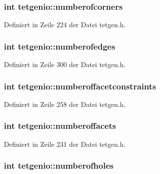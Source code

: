 \hypertarget{classtetgenio_a7d31410cbdcf2c1557ae7c1148c2eed7}{
\subsubsection[{numberofcorners}]{\setlength{\rightskip}{0pt plus 5cm}int tetgenio\-::numberofcorners}}\label{classtetgenio_a7d31410cbdcf2c1557ae7c1148c2eed7}


Definiert in Zeile 224 der Datei tetgen.\-h.

\hypertarget{classtetgenio_a5f2c3193ef485cbbf53416538c9df73c}{
\subsubsection[{numberofedges}]{\setlength{\rightskip}{0pt plus 5cm}int tetgenio\-::numberofedges}}\label{classtetgenio_a5f2c3193ef485cbbf53416538c9df73c}


Definiert in Zeile 300 der Datei tetgen.\-h.

\hypertarget{classtetgenio_acd7176cc55338187a391016acfb53913}{
\subsubsection[{numberoffacetconstraints}]{\setlength{\rightskip}{0pt plus 5cm}int tetgenio\-::numberoffacetconstraints}}\label{classtetgenio_acd7176cc55338187a391016acfb53913}


Definiert in Zeile 258 der Datei tetgen.\-h.

\hypertarget{classtetgenio_af1cb1515751c9cd0497abba62da8790d}{
\subsubsection[{numberoffacets}]{\setlength{\rightskip}{0pt plus 5cm}int tetgenio\-::numberoffacets}}\label{classtetgenio_af1cb1515751c9cd0497abba62da8790d}


Definiert in Zeile 231 der Datei tetgen.\-h.

\hypertarget{classtetgenio_ad12a46036cd44a7a646228d5471b51ac}{
\subsubsection[{numberofholes}]{\setlength{\rightskip}{0pt plus 5cm}int tetgenio\-::numberofholes}}\label{classtetgenio_ad12a46036cd44a7a646228d5471b51ac}


